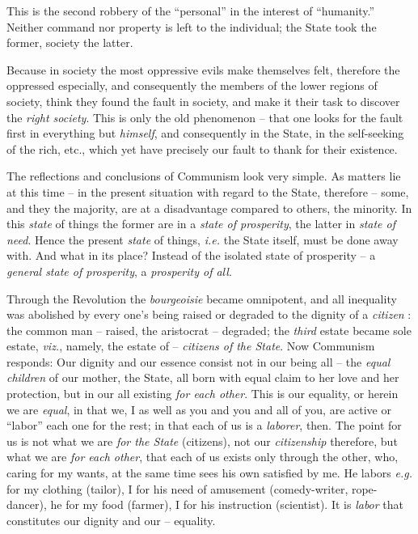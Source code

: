 This is the second robbery of the ``personal'' in the interest of 
``humanity.'' Neither command nor property is left to the individual; the 
State took the former, society the latter.

Because in society the most oppressive evils make themselves felt, therefore 
the oppressed especially, and consequently the members of the lower regions of 
society, think they found the fault in society, and make it their task to 
discover the \textit{right society}. This is only the old phenomenon -- that 
one looks for the fault first in everything but \textit{himself}, and 
consequently in the State, in the self-seeking of the rich, etc., which yet 
have precisely our fault to thank for their existence.

 The reflections and conclusions of Communism look very simple. As matters lie 
at this time -- in the present situation with regard to the State, therefore 
-- some, and they the majority, are at a disadvantage compared to others, the 
minority. In this \textit{state} of things the former are in a \textit{state 
of prosperity}, the latter in \textit{state of need}. Hence the present 
\textit{state} of things, \textit{i.e.} the State itself, must be done away 
with. And what in its place? Instead of the isolated state of prosperity -- a 
\textit{general state of prosperity}, a \textit{prosperity of all}.

Through the Revolution the \textit{bourgeoisie} became omnipotent, and all 
inequality was abolished by every one's being raised or degraded to the 
dignity of a \textit{citizen} : the common man -- raised, the aristocrat -- 
degraded; the \textit{third} estate became sole estate, \textit{viz.}, namely, 
the estate of -- \textit{citizens of the State}. Now Communism responds: Our 
dignity and our essence consist not in our being all -- the \textit{equal 
children} of our mother, the State, all born with equal claim to her love and 
her protection, but in our all existing \textit{for each other}. This is our 
equality, or herein we are \textit{equal}, in that we, I as well as you and 
you and all of you, are active or ``labor'' each one for the rest; in that 
each of us is a \textit{laborer}, then. The point for us is not what we are 
\textit{for the State} (citizens), not our \textit{citizenship} therefore, but 
what we are \textit{for each other}, that each of us exists only through the 
other, who, caring for my wants, at the same time sees his own satisfied by 
me. He labors \textit{e.g.} for my clothing (tailor), I for his need of 
amusement (comedy-writer, rope-dancer), he for my food (farmer), I for his 
instruction (scientist). It is \textit{labor} that constitutes our dignity and 
our -- equality.


